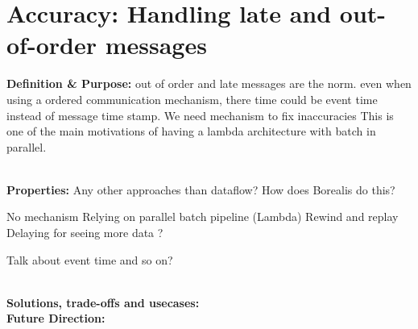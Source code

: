 \section{Accuracy: Handling late and out-of-order messages}

\noindent\textbf{Definition \& Purpose:} 
out of order and late messages are the norm.  even when using a ordered communication mechanism, there time could be event time instead of message time stamp. We need mechanism to fix inaccuracies This is one of the main motivations of having a lambda architecture with batch in parallel.

\noindent \textbf{\\Properties:}
Any other approaches than dataflow?
How does Borealis do this? 


No mechanism
Relying on parallel batch pipeline (Lambda)
Rewind and replay
Delaying for seeing more data ?


Talk about event time and so on?

\noindent \textbf{\\Solutions, trade-offs and usecases:}
\noindent \textbf{\\Future Direction:}  
